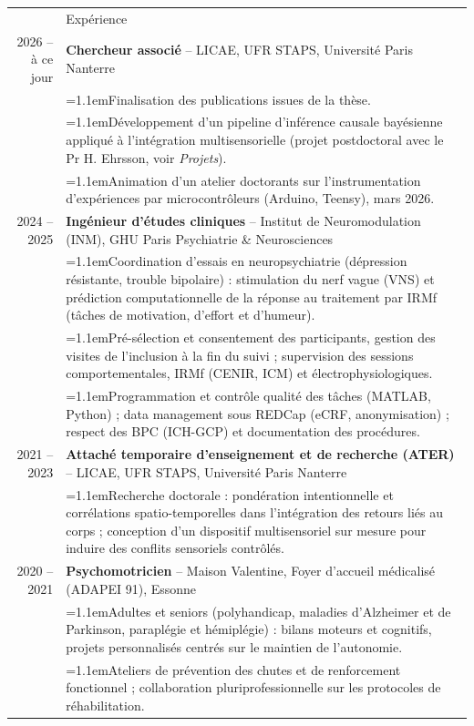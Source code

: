 \documentclass[a4paper, 11pt]{article}
\newcommand{\headingfont}{\Large\color{PineGreen}}
\newcommand{\bul}[1]{\hangindent=1.1em\hangafter=1\makebox[1.1em][l]{--}#1}
\newenvironment{SectionTable}[1]{
	\renewcommand*{\arraystretch}{1.1}
	\setlength{\tabcolsep}{8pt}
	\begin{longtable}{Rp{5.15in}} & #1 \\*}
{\end{longtable}\vspace{2pt}}
\begin{document}
\begin{SectionTable}{\headingfont Expérience}
	2026 -- à ce jour &
	\textbf{Chercheur associé} -- LICAE, UFR STAPS, Université Paris Nanterre \href{https://licae.parisnanterre.fr/}{\faGlobe} \\
	& \bul{Finalisation des publications issues de la thèse.} \\
	& \bul{Développement d'un pipeline d'inférence causale bayésienne appliqué à l'intégration multisensorielle (projet postdoctoral avec le Pr H. Ehrsson, voir \textit{Projets}).} \\
	& \bul{Animation d'un atelier doctorants sur l'instrumentation d'expériences par microcontrôleurs (Arduino, Teensy), mars 2026.} \\

	2024 -- 2025 &
	\textbf{Ingénieur d'études cliniques} -- Institut de Neuromodulation (INM), GHU Paris Psychiatrie \& Neurosciences \href{https://www.ghu-paris.fr/fr/linstitut-de-neuromodulation}{\faGlobe} \\
	& \bul{Coordination d'essais en neuropsychiatrie (dépression résistante, trouble bipolaire) : stimulation du nerf vague (VNS) et prédiction computationnelle de la réponse au traitement par IRMf (tâches de motivation, d'effort et d'humeur).} \\
	& \bul{Pré-sélection et consentement des participants, gestion des visites de l'inclusion à la fin du suivi ; supervision des sessions comportementales, IRMf (CENIR, ICM) et électrophysiologiques.} \\
	& \bul{Programmation et contrôle qualité des tâches (MATLAB, Python) ; data management sous REDCap (eCRF, anonymisation) ; respect des BPC (ICH-GCP) et documentation des procédures.} \\

	2021 -- 2023 &
	\textbf{Attaché temporaire d'enseignement et de recherche (ATER)} -- LICAE, UFR STAPS, Université Paris Nanterre \\
	& \bul{Recherche doctorale : pondération intentionnelle et corrélations spatio-temporelles dans l'intégration des retours liés au corps ; conception d'un dispositif multisensoriel sur mesure pour induire des conflits sensoriels contrôlés.} \\

	2020 -- 2021 &
	\textbf{Psychomotricien} -- Maison Valentine, Foyer d'accueil médicalisé (ADAPEI 91), Essonne \href{https://adapei91.fr/maison-valentine/}{\faGlobe} \\
	& \bul{Adultes et seniors (polyhandicap, maladies d'Alzheimer et de Parkinson, paraplégie et hémiplégie) : bilans moteurs et cognitifs, projets personnalisés centrés sur le maintien de l'autonomie.} \\
	& \bul{Ateliers de prévention des chutes et de renforcement fonctionnel ; collaboration pluriprofessionnelle sur les protocoles de réhabilitation.} \\


\end{SectionTable}
\end{document}
